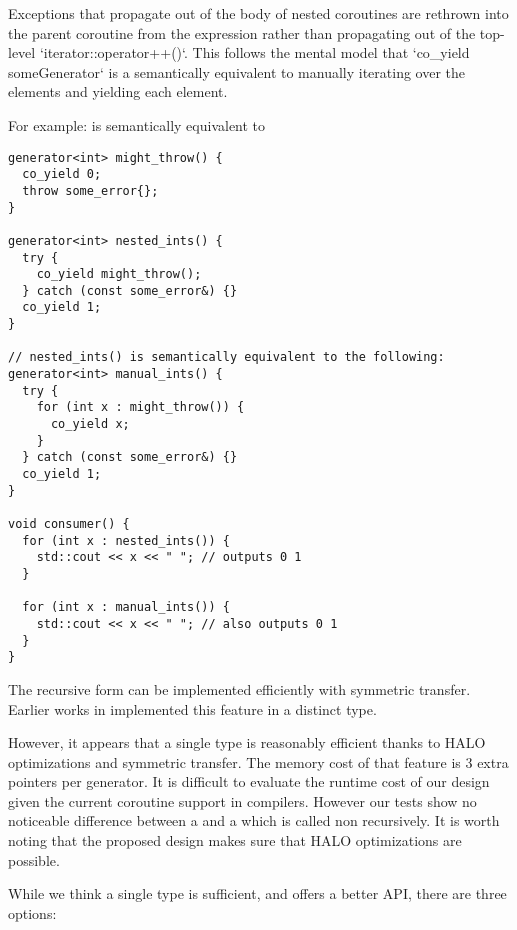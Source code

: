 \documentclass{wg21}
\begin{document}
Exceptions that propagate out of the body of nested  coroutines
are rethrown into the parent coroutine from the  expression rather
than propagating out of the top-level `iterator::operator++()`. This follows the
mental model that `co_yield someGenerator` is a semantically equivalent to manually
iterating over the elements and yielding each element.

For example:  is semantically equivalent to 
\begin{lstlisting}[style=color]
generator<int> might_throw() {
  co_yield 0;
  throw some_error{};
}

generator<int> nested_ints() {
  try {
    co_yield might_throw();
  } catch (const some_error&) {}
  co_yield 1;
}

// nested_ints() is semantically equivalent to the following:
generator<int> manual_ints() {
  try {
    for (int x : might_throw()) {
      co_yield x;
    }
  } catch (const some_error&) {}
  co_yield 1;
}

void consumer() {
  for (int x : nested_ints()) {
    std::cout << x << " "; // outputs 0 1
  }
  
  for (int x : manual_ints()) {
    std::cout << x << " "; // also outputs 0 1
  }
}
\end{lstlisting}


The recursive form can be implemented efficiently with symmetric transfer.
Earlier works in \cite{CppCoro} implemented this feature in a distinct  type.

However, it appears that a single type is reasonably efficient thanks to HALO optimizations and symmetric transfer.
The memory cost of that feature is 3 extra pointers per generator.
It is difficult to evaluate the runtime cost of our design given the current coroutine support in compilers.
However our tests show no noticeable difference between a  and a  
which is called non recursively. It is worth noting that the proposed design makes sure that HALO \cite{P0981R0} optimizations are possible.

While we think a single  type is sufficient, and offers a better API, there are three options:
\end{document}
